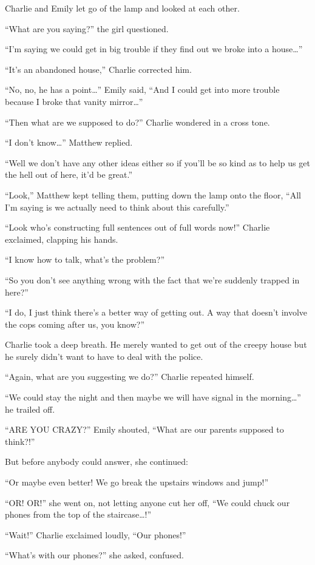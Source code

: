 Charlie and Emily let go of the lamp and looked at each other.

“What are you saying?” the girl questioned.

“I’m saying we could get in big trouble if they find out we broke into a house…”

“It’s an abandoned house,” Charlie corrected him.

“No, no, he has a point…” Emily said, “And I could get into more trouble because I broke that vanity mirror…”

“Then what are we supposed to do?” Charlie wondered in a cross tone.

“I don’t know…” Matthew replied.

“Well we don’t have any other ideas either so if you’ll be so kind as to help us get the hell out of here, it’d be great.”

“Look,” Matthew kept telling them, putting down the lamp onto the floor, “All I’m saying is we actually need to think about this carefully.”

“Look who’s constructing full sentences out of full words now!” Charlie exclaimed, clapping his hands.

“I know how to talk, what’s the problem?”

“So you don’t see anything wrong with the fact that we’re suddenly trapped in here?”

“I do, I just think there’s a better way of getting out. A way that doesn’t involve the cops coming after us, you know?”

Charlie took a deep breath. He merely wanted to get out of the creepy house but he surely didn’t want to have to deal with the police.

“Again, what are you suggesting we do?” Charlie repeated himself.

“We could stay the night and then maybe we will have signal in the morning…” he trailed off.

“ARE YOU CRAZY?” Emily shouted, “What are our parents supposed to think?!”

But before anybody could answer, she continued:

“Or maybe even better! We go break the upstairs windows and jump!”

“OR! OR!” she went on, not letting anyone cut her off, “We could chuck our phones from the top of the staircase…!”

“Wait!” Charlie exclaimed loudly, “Our phones!”

“What’s with our phones?” she asked, confused.

